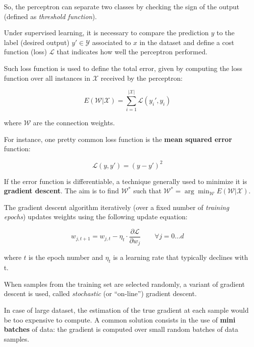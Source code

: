 So, the perceptron can separate two classes by checking the sign of the output (defined as \textit{threshold function}).

Under supervised learning, it is necessary to compare the prediction $y$ to the label (desired output) $y' \in \mathcal{Y}$ associated to $x$ in the dataset and define a cost function (loss) $\mathcal{L}$ that indicates how well the perceptron performed.

Such loss function is used to define the total error, given by computing the loss function over all instances in $\mathcal{X}$ received by the perceptron:

\begin{equation}
E(\mathcal{W}| \mathcal{X}) = \sum_{i = 1}^{|\mathcal{X}|} \mathcal{L}(y_i', y_i)
\end{equation}

where $\mathcal{W}$ are the connection weights.

For instance, one pretty common loss function is the \textbf{mean squared error} function:

\begin{equation}
    \mathcal{L}(y, y') = (y - y')^2
\end{equation}

If the error function is differentiable, a technique generally used to minimize it is \textbf{gradient descent}. The aim is to find $\mathcal{W}^*$ such that $\mathcal{W}^* = \arg \min_{\mathcal{W}} E(\mathcal{W}| \mathcal{X})$.

The gradient descent algorithm iteratively (over a fixed number of \textit{training epochs})
updates weights using the following update equation:

\begin{equation}
\tag{gradient descent}
w_{j, t+1} = w_{j,t} - \eta_t \cdot \frac{ \partial \mathcal{L}}{\partial w_j} \qquad \forall j=0 \dots d
\end{equation}

where $t$ is the epoch number and $\eta_t$ is a learning rate that typically declines with t.

When samples from the training set are selected randomly, a variant of gradient descent is used, called \textit{stochastic} (or ``on-line'') gradient descent.

In case of large dataset, the estimation of the true gradient at each sample would be too expensive to compute. A common solution consists in the use of \textbf{mini batches} of data: the gradient is computed over small random batches of data samples.

